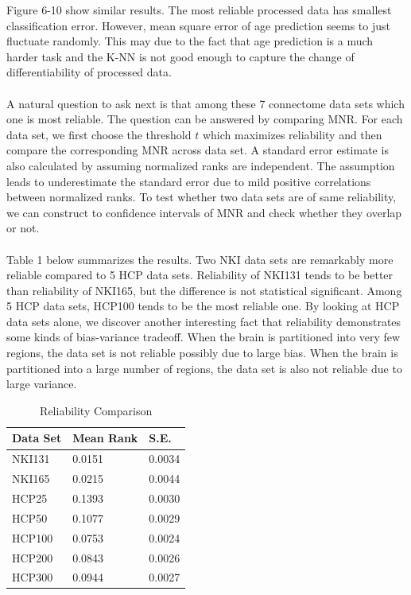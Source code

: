 \documentclass{article}
\begin{document}
\noindent Figure 6-10 show similar results. The most reliable processed data has smallest classification error. However, mean square error of age prediction seems to just fluctuate randomly. This may due to the fact that age prediction is a much harder task and the K-NN is not good enough to capture the change of differentiability of processed data.\\
\\
A natural question to ask next is that among these 7 connectome data sets which one is most reliable. The question can be answered by comparing MNR. For each data set, we first choose the threshold $t$ which maximizes reliability and then compare the corresponding MNR across data set. A standard error estimate is also calculated by assuming normalized ranks are independent. The assumption leads to underestimate the standard error due to mild positive correlations between normalized ranks. To test whether two data sets are of same reliability, we can construct to confidence intervals of MNR and check whether they overlap or not. \\
\\
Table 1 below summarizes the results. Two NKI data sets are remarkably more reliable compared to 5 HCP data sets. Reliability of NKI131 tends to be better than reliability of NKI165, but the difference is not statistical significant. Among 5 HCP data sets, HCP100 tends to be the most reliable one. By looking at HCP data sets alone, we discover another interesting fact that reliability demonstrates some kinds of bias-variance tradeoff. When the brain is partitioned into very few regions, the data set is not reliable possibly due to large bias. When the brain is partitioned into a large number of regions, the data set is also not reliable due to large variance. 

\begin{table}

\begin{center}
  \begin{tabular}{| p{2.5 cm} | p{2.5 cm} | p{2.5 cm} |}
    \hline
    Data Set & Mean Rank & S.E. \\ \hline
    NKI131 & 0.0151 & 0.0034 \\ \hline
    NKI165 & 0.0215 & 0.0044 \\ \hline
    HCP25 & 0.1393 & 0.0030 \\ \hline
    HCP50 & 0.1077 & 0.0029 \\ \hline
    HCP100 & 0.0753 & 0.0024 \\ \hline
    HCP200 & 0.0843 & 0.0026 \\ \hline
    HCP300 & 0.0944 & 0.0027 \\ \hline
  \end{tabular}
  \caption{Reliability Comparison}
\end{center}
\end{table}
\end{document}
